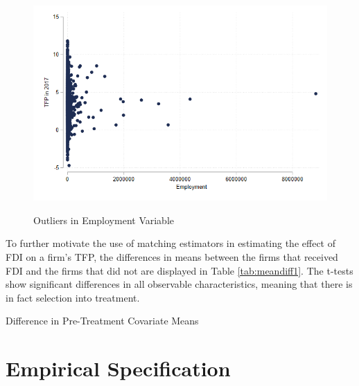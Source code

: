 \documentclass[a4paper,11pt]{scrartcl}
\begin{document}
\begin{figure}[h]\centering
	\caption{Outliers in Employment Variable}
	\includegraphics[width=\textwidth]{emp15_outliers}
  	\label{fig:outliers}
\end{figure} 

To further motivate the use of matching estimators in estimating the effect of FDI on a firm's TFP, the differences in means between the firms that received FDI and the firms that did not are displayed in Table \ref{tab:meandiff1}. The t-tests show significant differences in all observable characteristics, meaning that there is in fact selection into treatment.

\begin{table}[hbtp!]
	\centering
	\caption{Difference in Pre-Treatment Covariate Means}
	
	\label{tab:meandiff1}
\end{table}


\section{Empirical Specification}
\end{document}
